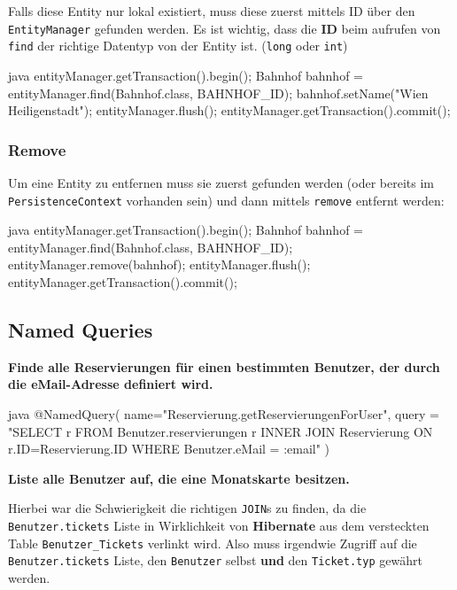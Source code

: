 Falls diese Entity nur lokal existiert, muss diese zuerst mittels ID über den \texttt{EntityManager} gefunden werden. Es ist wichtig, dass die \textbf{ID} beim aufrufen von \texttt{find} der richtige Datentyp von der Entity ist. (\texttt{long} oder \texttt{int})

\begin{code}{java}
entityManager.getTransaction().begin();
Bahnhof bahnhof = entityManager.find(Bahnhof.class, BAHNHOF_ID);
bahnhof.setName("Wien Heiligenstadt");
entityManager.flush();
entityManager.getTransaction().commit();
\end{code}

\subsubsection{Remove}

Um eine Entity zu entfernen muss sie zuerst gefunden werden (oder bereits im \texttt{PersistenceContext} vorhanden sein) und dann mittels \texttt{remove} entfernt werden:

\begin{code}{java}
entityManager.getTransaction().begin();
Bahnhof bahnhof = entityManager.find(Bahnhof.class, BAHNHOF_ID);
entityManager.remove(bahnhof);
entityManager.flush();
entityManager.getTransaction().commit();
\end{code}

\clearpage
\subsection{Named Queries}

\textbf{Finde alle Reservierungen für einen bestimmten Benutzer, der durch die eMail-Adresse definiert wird.}

\begin{code}{java}
@NamedQuery(
    name="Reservierung.getReservierungenForUser",
    query = "SELECT r FROM Benutzer.reservierungen r INNER JOIN Reservierung ON r.ID=Reservierung.ID WHERE Benutzer.eMail = :email"
)
\end{code}

\textbf{Liste alle Benutzer auf, die eine Monatskarte besitzen.}

Hierbei war die Schwierigkeit die richtigen \texttt{JOIN}s zu finden, da die \texttt{Benutzer.tickets} Liste in Wirklichkeit von \textbf{Hibernate} aus dem versteckten Table \texttt{Benutzer\_Tickets} verlinkt wird. Also muss irgendwie Zugriff auf die \texttt{Benutzer.tickets} Liste, den \texttt{Benutzer} selbst \textbf{und} den \texttt{Ticket.typ} gewährt werden.


